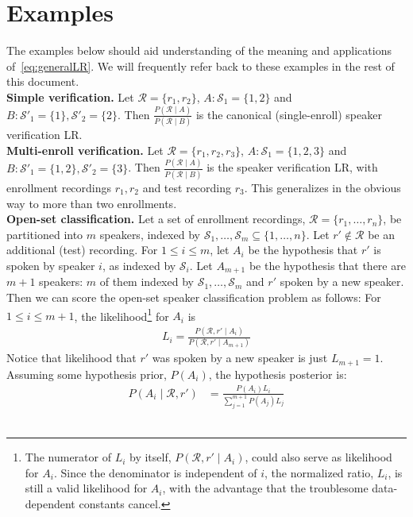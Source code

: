 \documentclass[a4paper,oneside,12pt,english]{report}
\def\Rset{\mathcal{R}}
\def\Sset{\mathcal{S}}
\begin{document}
\section{Examples}
\label{sec:examples}
The examples below should aid understanding of the meaning and applications of~\eqref{eq:generalLR}. We will frequently refer back to these examples in the rest of this document.\\

\noindent\textbf{Simple verification.} Let $\Rset=\{r_1,r_2\}$, $A:\Sset_1=\{1,2\}$ and $B:\Sset'_1=\{1\},\Sset'_2=\{2\}$. Then $\frac{P(\Rset\mid A)}{P(\Rset\mid B)}$ is the canonical (single-enroll) speaker verification LR.\\

\noindent\textbf{Multi-enroll verification.} Let $\Rset=\{r_1,r_2,r_3\}$, $A:\Sset_1=\{1,2,3\}$ and $B:\Sset'_1=\{1,2\},\Sset'_2=\{3\}$. Then $\frac{P(\Rset\mid A)}{P(\Rset\mid B)}$ is the speaker verification LR, with enrollment recordings $r_1,r_2$ and test recording $r_3$. This generalizes in the obvious way to more than two enrollments.\\

\noindent\textbf{Open-set classification.} Let a set of enrollment recordings, $\Rset=\{r_1,\ldots,r_n\}$, be partitioned into $m$ speakers, indexed by $\Sset_1,\ldots,\Sset_m\subseteq\{1,\ldots,n\}$. Let $r'\not\in\Rset$ be an additional (test) recording. For $1\le i\le m$, let $A_i$ be the hypothesis that $r'$ is spoken by speaker $i$, as indexed by $\Sset_i$. Let $A_{m+1}$ be the hypothesis that there are $m+1$ speakers: $m$ of them indexed by $\Sset_1,\ldots,\Sset_m$ and $r'$ spoken by a new speaker.  Then we can score the open-set speaker classification problem as follows: For $1\le i\le m+1$, the likelihood\footnote{The numerator of $L_i$ by itself, $P(\Rset,r'\mid A_i)$, could also serve as likelihood for $A_i$. Since the denominator is independent of $i$, the normalized ratio, $L_i$, is still a valid likelihood for $A_i$, with the advantage that the troublesome data-dependent constants cancel.} for $A_i$ is 
\begin{align}
L_i=\frac{P(\Rset,r'\mid A_i)}{P(\Rset,r'\mid A_{m+1})}
\end{align}
Notice that likelihood that $r'$ was spoken by a new speaker is just $L_{m+1}=1$. Assuming some hypothesis prior, $P(A_i)$, the hypothesis posterior is:
\begin{align}
P(A_i\mid\Rset,r') &= \frac{P(A_i)L_i}{\sum_{j=1}^{m+1} P(A_j)L_j}
\end{align}\\
	
\end{document}
